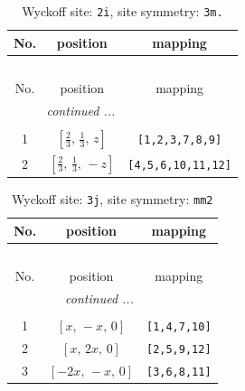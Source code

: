 \documentclass[fleqn,8pt]{jsarticle}
\begin{document}
\renewcommand{\arraystretch}{1.2}
\begin{longtable}{ccc}
\caption{Wyckoff site: {\tt 2i}, site symmetry: {\tt 3m.}}
 \\
 \hline \hline
No. & position & mapping \\ \hline \endfirsthead

\multicolumn{2}{l}{\tablename\ \thetable{}} \\
 \hline \hline
No. & position & mapping \\ \hline \endhead

 \hline \hline
\multicolumn{2}{r}{\footnotesize\it continued ...} \\ \endfoot

 \hline \hline
\multicolumn{2}{r}{} \\ \endlastfoot

1 & $\left[ \frac{2}{3},\, \frac{1}{3},\, z \right]$ & {\tt [1,2,3,7,8,9]} \\ \hline
2 & $\left[ \frac{2}{3},\, \frac{1}{3},\, - z \right]$ & {\tt [4,5,6,10,11,12]} \\
\end{longtable}
\renewcommand{\arraystretch}{1.2}
\begin{longtable}{ccc}
\caption{Wyckoff site: {\tt 3j}, site symmetry: {\tt mm2}}
 \\
 \hline \hline
No. & position & mapping \\ \hline \endfirsthead

\multicolumn{2}{l}{\tablename\ \thetable{}} \\
 \hline \hline
No. & position & mapping \\ \hline \endhead

 \hline \hline
\multicolumn{2}{r}{\footnotesize\it continued ...} \\ \endfoot

 \hline \hline
\multicolumn{2}{r}{} \\ \endlastfoot

1 & $\left[ x,\, - x,\, 0 \right]$ & {\tt [1,4,7,10]} \\ \hline
2 & $\left[ x,\, 2 x,\, 0 \right]$ & {\tt [2,5,9,12]} \\ \hline
3 & $\left[ - 2 x,\, - x,\, 0 \right]$ & {\tt [3,6,8,11]} \\
\end{longtable}
\renewcommand{\arraystretch}{1.2}
\end{document}
